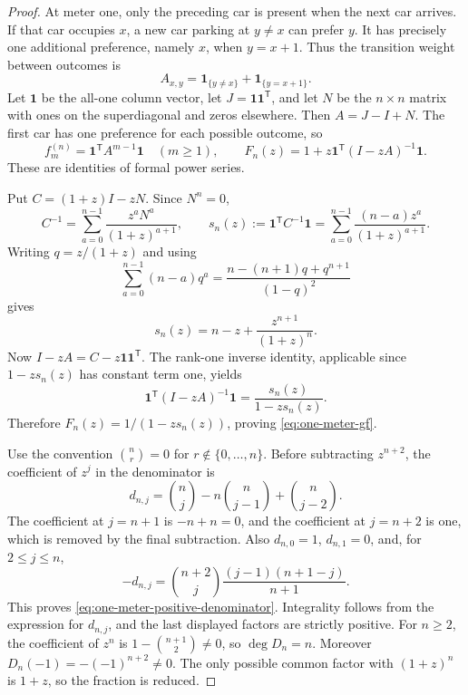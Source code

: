 \documentclass[11pt,a4paper]{article}
\begin{document}
\begin{proof}
At meter one, only the preceding car is present when the next car arrives.
If that car occupies $x$, a new car parking at $y\neq x$ can prefer $y$.
It has precisely one additional preference, namely $x$, when $y=x+1$.
Thus the transition weight between outcomes is
\[
 A_{x,y}=\mathbf1_{\{y\neq x\}}+\mathbf1_{\{y=x+1\}}.
\]
Let $\boldsymbol1$ be the all-one column vector, let
$J=\boldsymbol1\boldsymbol1^{\mathsf T}$, and let $N$ be the $n\times n$
matrix with ones on the superdiagonal and zeros elsewhere. Then
$A=J-I+N$. The first car has one preference for each possible outcome, so
\[
 f_m^{(n)}=\boldsymbol1^{\mathsf T}A^{m-1}\boldsymbol1
 \quad(m\geq1),\qquad
 F_n(z)=1+z\boldsymbol1^{\mathsf T}(I-zA)^{-1}\boldsymbol1.
\]
These are identities of formal power series.

Put $C=(1+z)I-zN$. Since $N^n=0$,
\[
 C^{-1}=\sum_{a=0}^{n-1}\frac{z^aN^a}{(1+z)^{a+1}},\qquad
 s_n(z):=\boldsymbol1^{\mathsf T}C^{-1}\boldsymbol1
 =\sum_{a=0}^{n-1}\frac{(n-a)z^a}{(1+z)^{a+1}}.
\]
Writing $q=z/(1+z)$ and using
\[
 \sum_{a=0}^{n-1}(n-a)q^a
 =\frac{n-(n+1)q+q^{n+1}}{(1-q)^2}
\]
gives
\[
 s_n(z)=n-z+\frac{z^{n+1}}{(1+z)^n}.
\]
Now $I-zA=C-z\boldsymbol1\boldsymbol1^{\mathsf T}$. The rank-one
inverse identity, applicable since $1-zs_n(z)$ has constant term one, yields
\[
 \boldsymbol1^{\mathsf T}(I-zA)^{-1}\boldsymbol1
 =\frac{s_n(z)}{1-zs_n(z)}.
\]
Therefore $F_n(z)=1/(1-zs_n(z))$, proving \eqref{eq:one-meter-gf}.

Use the convention $\binom nr=0$ for $r\notin\{0,\ldots,n\}$.
Before subtracting $z^{n+2}$, the coefficient of $z^j$ in the denominator is
\[
 d_{n,j}=\binom nj-n\binom n{j-1}+\binom n{j-2}.
\]
The coefficient at $j=n+1$ is $-n+n=0$, and the coefficient at $j=n+2$
is one, which is removed by the final subtraction. Also $d_{n,0}=1$,
$d_{n,1}=0$, and, for $2\leq j\leq n$,
\[
 -d_{n,j}=\binom{n+2}{j}\frac{(j-1)(n+1-j)}{n+1}.
\]
This proves \eqref{eq:one-meter-positive-denominator}. Integrality follows
from the expression for $d_{n,j}$, and the last displayed factors are
strictly positive. For $n\geq2$, the coefficient of $z^n$ is
$1-\binom{n+1}{2}\neq0$, so $\deg D_n=n$.
Moreover $D_n(-1)=-(-1)^{n+2}\neq0$.
The only possible common factor with $(1+z)^n$ is $1+z$, so the fraction is
reduced.


\end{proof}
\end{document}
